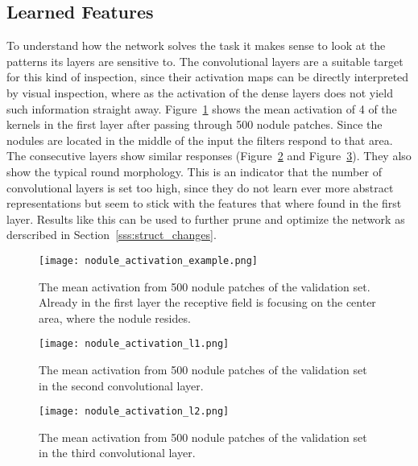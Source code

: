 \documentclass[main.tex]{subfiles}
\begin{document}
\subsection{Learned Features}\label{ss:features}
To understand how the network solves the task it makes sense to look at the patterns its layers are sensitive to. The convolutional layers are a suitable target for this kind of inspection, since their activation maps can be directly interpreted by visual inspection, where as the activation of the dense layers does not yield such information straight away. Figure~\ref{fig:mean_activation} shows the mean activation of 4 of the kernels in the first layer after passing through 500 nodule patches. Since the nodules are located in the middle of the input the filters respond to that area. The consecutive layers show similar responses (Figure~\ref{fig:mean_activation_l1} and Figure~\ref{fig:mean_activation_l2}). They also show the typical round morphology. This is an indicator that the number of convolutional layers is set too high, since they do not learn ever more abstract representations but seem to stick with the features that where found in the first layer. Results like this can be used to further prune and optimize the network as derscribed in Section~\ref{sss:struct_changes}.


\begin{figure}[H]
\begin{center}
\texttt{[image: nodule\_activation\_example.png]}
\end{center}
\caption{The mean activation from 500 nodule patches of the validation set. Already in the first layer the receptive field is focusing on the center area, where the nodule resides.}
\label{fig:mean_activation}
\end{figure}

\begin{figure}
\begin{center}
\texttt{[image: nodule\_activation\_l1.png]}
\end{center}
\caption{The mean activation from 500 nodule patches of the validation set in the second convolutional layer.}
\label{fig:mean_activation_l1}
\end{figure}

\begin{figure}
\begin{center}
\texttt{[image: nodule\_activation\_l2.png]}
\end{center}
\caption{The mean activation from 500 nodule patches of the validation set in the third convolutional layer.}
\label{fig:mean_activation_l2}
\end{figure}
\end{document}
